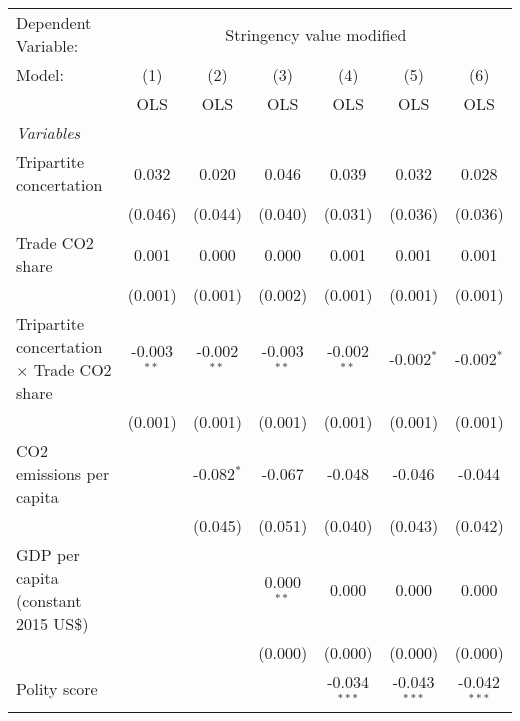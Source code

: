 
\begingroup
\centering
\begin{tabular}{lcccccc}
   \toprule
   Dependent Variable: & \multicolumn{6}{c}{Stringency value modified}\\
   Model:                                            & (1)           & (2)           & (3)           & (4)            & (5)            & (6)\\  
                                                     &  OLS          & OLS           & OLS           & OLS            & OLS            & OLS\\  
   \midrule
   \emph{Variables}\\
   Tripartite concertation                           & 0.032         & 0.020         & 0.046         & 0.039          & 0.032          & 0.028\\   
                                                     & (0.046)       & (0.044)       & (0.040)       & (0.031)        & (0.036)        & (0.036)\\   
   Trade CO2 share                                   & 0.001         & 0.000         & 0.000         & 0.001          & 0.001          & 0.001\\   
                                                     & (0.001)       & (0.001)       & (0.002)       & (0.001)        & (0.001)        & (0.001)\\   
   Tripartite concertation $\times$ Trade CO2 share  & -0.003$^{**}$ & -0.002$^{**}$ & -0.003$^{**}$ & -0.002$^{**}$  & -0.002$^{*}$   & -0.002$^{*}$\\   
                                                     & (0.001)       & (0.001)       & (0.001)       & (0.001)        & (0.001)        & (0.001)\\   
   CO2 emissions per capita                          &               & -0.082$^{*}$  & -0.067        & -0.048         & -0.046         & -0.044\\   
                                                     &               & (0.045)       & (0.051)       & (0.040)        & (0.043)        & (0.042)\\   
   GDP per capita (constant 2015 US\$)               &               &               & 0.000$^{**}$  & 0.000          & 0.000          & 0.000\\   
                                                     &               &               & (0.000)       & (0.000)        & (0.000)        & (0.000)\\   
   Polity score                                      &               &               &               & -0.034$^{***}$ & -0.043$^{***}$ & -0.042$^{***}$\\   

\end{tabular}
